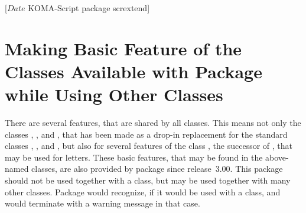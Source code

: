 %
%
%
%
%
%
%
%
% 
%
%
%
%

                 [$Date$
                  KOMA-Script package scrextend]


\chapter{Making Basic Feature of the \KOMAScript{} Classes Available with
  Package  while Using Other Classes}
%

There are several features, that are shared by all \KOMAScript{} classes. This
means not only the classes , , and
, that has been made as a drop-in replacement for the standard
classes , , and , but also for
several features of the \KOMAScript{} class , the successor of
, that may be used for letters. These basic features, that may
be found in the above-named classes, are also provided by package
 since \KOMAScript{} release~3.00. This package should not
be used together with a \KOMAScript{} class, but may be used together with
many other classes. Package  would recognize, if it would
be used with a \KOMAScript{} class, and would terminate with a warning message
in that case.

